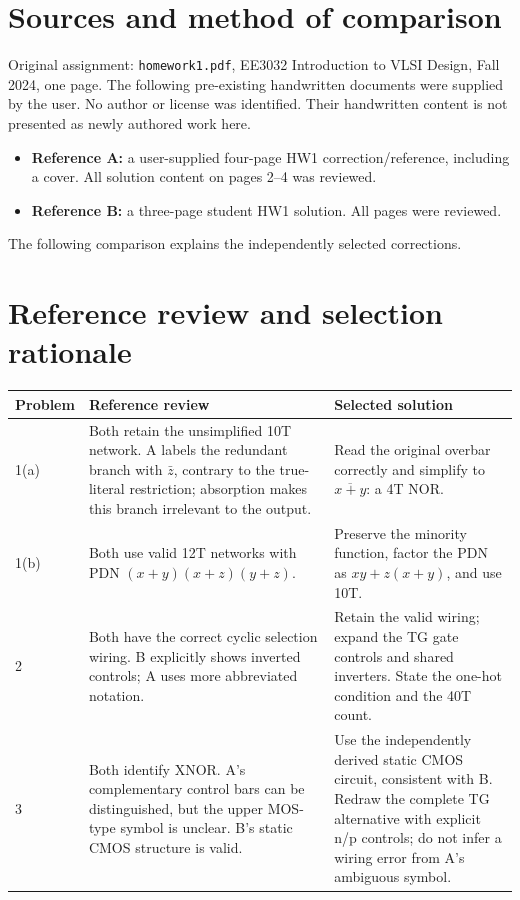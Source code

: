 \documentclass[11pt,a4paper]{article}
\begin{document}
\section*{Sources and method of comparison}
Original assignment: \texttt{homework1.pdf}, EE3032 Introduction to VLSI Design,
Fall 2024, one page. The following pre-existing handwritten documents
were supplied by the user. No author or license was identified. Their handwritten
content is not presented as newly authored work here.
\begin{itemize}
 \item \textbf{Reference A:} a user-supplied four-page HW1 correction/reference,
 including a cover. All solution content on pages 2--4 was reviewed.
 \item \textbf{Reference B:} a three-page student HW1 solution. All pages were reviewed.
\end{itemize}
The following comparison explains the independently selected corrections.

\newpage
\section*{Reference review and selection rationale}
\begin{tabular}{p{.09\linewidth}p{.39\linewidth}p{.43\linewidth}}\toprule
Problem&Reference review&Selected solution\\\midrule
1(a)&Both retain the unsimplified 10T network. A labels the redundant branch
with $\bar z$, contrary to the true-literal restriction; absorption makes this
branch irrelevant to the output.&
Read the original overbar correctly and simplify to $\overline{x+y}$: a 4T NOR.\\
1(b)&Both use valid 12T networks with PDN $(x+y)(x+z)(y+z)$.&
Preserve the minority function, factor the PDN as $xy+z(x+y)$, and use 10T.\\
2&Both have the correct cyclic selection wiring. B explicitly shows inverted
controls; A uses more abbreviated notation.&
Retain the valid wiring; expand the TG gate controls and shared inverters.
State the one-hot condition and the 40T count.\\
3&Both identify XNOR. A's complementary control bars can be distinguished, but
the upper MOS-type symbol is unclear. B's static CMOS structure is valid.&
Use the independently derived static CMOS circuit, consistent with B. Redraw
the complete TG alternative with explicit n/p controls; do not infer a wiring
error from A's ambiguous symbol.\\\bottomrule
\end{tabular}
\end{document}

